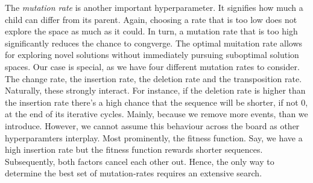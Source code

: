 \documentclass[./../../paper.tex]{subfiles}
\begin{document}
The \emph{mutation rate} is another important hyperparameter. It signifies how much a child can differ from its parent. Again, choosing a rate that is too low does not explore the space as much as it could. In turn, a mutation rate that is too high significantly reduces the chance to congverge. The optimal muitation rate allows for exploring novel solutions without immediately pursuing suboptimal solution spaces. Our case is special, as we have four different mutation rates to consider. The change rate, the insertion rate, the deletion rate and the transposition rate. Naturally, these strongly interact. For instance, if the deletion rate is higher than the insertion rate there's a high chance that the sequence will be shorter, if not 0, at the end of its iterative cycles. Mainly, because we remove more events, than we introduce. However, we cannot assume this behaviour across the board as other hyperparamters interplay. Most prominently, the fitness function. Say, we have a high insertion rate but the fitness function rewards shorter sequences. Subsequently, both factors cancel each other out. Hence, the only way to determine the best set of mutation-rates requires an extensive search.

\end{document}
